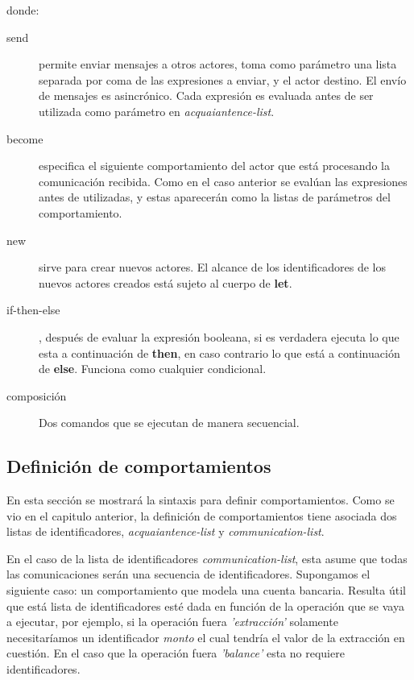 donde:

\begin{description}
\item [send] permite enviar mensajes a otros actores, toma como parámetro una lista separada por coma de las expresiones a enviar, y el actor destino. El envío de mensajes es asincrónico. Cada expresión es evaluada antes de ser utilizada como parámetro en \textit{acquaiantence-list}.
\item [become] especifica el siguiente comportamiento del actor que está procesando la comunicación recibida. Como en el caso anterior se evalúan las expresiones antes de utilizadas, y estas aparecerán como la listas de parámetros del comportamiento. 
\item [new] sirve para crear nuevos actores. El alcance de los
  identificadores de los nuevos actores creados está sujeto al cuerpo de \textbf{let}.
\item [if-then-else], después de evaluar la expresión booleana, si es verdadera
  ejecuta lo que esta a continuación de \textbf{then}, en caso contrario lo que está a
  continuación de \textbf{else}. Funciona como cualquier condicional.
\item [composición] Dos comandos que se ejecutan de manera secuencial.

\end{description}

\subsection{Definición de comportamientos}\label{actores:beha}

En esta sección se mostrará la sintaxis para definir comportamientos. Como se vio en el capitulo anterior, la definición de comportamientos tiene asociada dos listas de identificadores, \textit{acquaiantence-list} y \textit{communication-list}. 

En el caso de la lista de identificadores \textit{communication-list}, esta asume que todas las comunicaciones serán una secuencia de identificadores. Supongamos el siguiente caso: un comportamiento que modela una cuenta bancaria. Resulta útil que está lista de identificadores esté dada en función de la operación que se vaya a ejecutar, por ejemplo, si la operación fuera \textit{'extracción'} solamente necesitaríamos un identificador \textit{monto} el cual tendría el valor de la extracción en cuestión. En el caso que la operación fuera \textit{'balance'} esta no requiere identificadores. 

